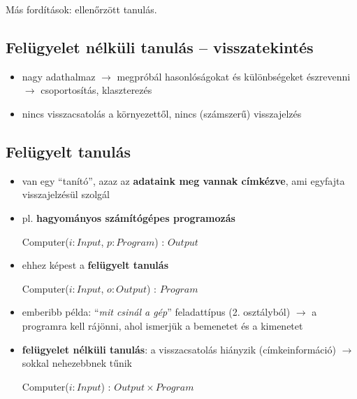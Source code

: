 \documentclass[a4paper, 11pt]{article}
\begin{document}
Más fordítások: ellenőrzött tanulás.

\subsection{Felügyelet nélküli tanulás -- visszatekintés}

\begin{itemize}
	\item nagy adathalmaz $\to$ megpróbál hasonlóságokat és különbségeket észrevenni $\to$ csoportosítás, klaszterezés
	\item nincs visszacsatolás a környezettől, nincs (számszerű) visszajelzés
\end{itemize}

\subsection{Felügyelt tanulás}

\begin{itemize}
	\item van egy ``tanító'', azaz az \textbf{adataink meg vannak címkézve}, ami egyfajta visszajelzésül szolgál
	\item pl. \textbf{hagyományos számítógépes programozás} %
	
	\begin{stuki*}[8cm]{Computer($i : Input$, $p : Program$) : $Output$}
	\end{stuki*}
	
	\item ehhez képest a \textbf{felügyelt tanulás}%
	
	\begin{stuki*}[8cm]{Computer($i : Input$, $o : Output$) : $Program$}
	\end{stuki*}
	
	\item emberibb példa: ``\textit{mit csinál a gép}'' feladattípus (2. osztályból) $\to$ a programra kell rájönni, ahol ismerjük a bemenetet és a kimenetet
	\item \textbf{felügyelet nélküli tanulás}: a visszacsatolás hiányzik (címkeinformáció) $\to$ sokkal nehezebbnek tűnik %
	
	\begin{stuki*}[8cm]{Computer($i : Input$) : $Output \times Program$}
	\end{stuki*}
\end{itemize}
\end{document}
